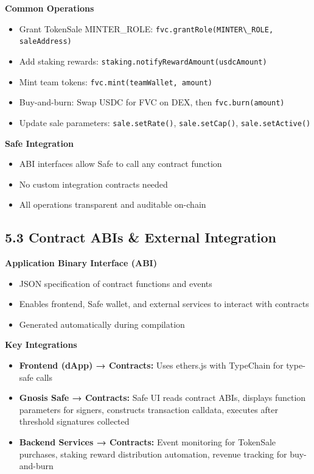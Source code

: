 \documentclass[
  paper=a4,
  ,captions=tableheading
]{scrartcl}
\newcommand{\passthrough}[1]{#1}
\providecommand{\tightlist}{%
  \setlength{\itemsep}{0pt}\setlength{\parskip}{0pt}}
\begin{document}
\textbf{Common Operations}

\begin{itemize}
\tightlist
\item
  Grant TokenSale MINTER\_ROLE: \passthrough{\lstinline!fvc.grantRole(MINTER\_ROLE, saleAddress)!}
\item
  Add staking rewards: \passthrough{\lstinline!staking.notifyRewardAmount(usdcAmount)!}
\item
  Mint team tokens: \passthrough{\lstinline!fvc.mint(teamWallet, amount)!}
\item
  Buy-and-burn: Swap USDC for FVC on DEX, then \passthrough{\lstinline!fvc.burn(amount)!}
\item
  Update sale parameters: \passthrough{\lstinline!sale.setRate()!}, \passthrough{\lstinline!sale.setCap()!}, \passthrough{\lstinline!sale.setActive()!}
\end{itemize}

\textbf{Safe Integration}

\begin{itemize}
\tightlist
\item
  ABI interfaces allow Safe to call any contract function
\item
  No custom integration contracts needed
\item
  All operations transparent and auditable on-chain
\end{itemize}

\subsection{5.3 Contract ABIs \& External Integration}\label{contract-abis-external-integration}

\textbf{Application Binary Interface (ABI)}

\begin{itemize}
\tightlist
\item
  JSON specification of contract functions and events
\item
  Enables frontend, Safe wallet, and external services to interact with contracts
\item
  Generated automatically during compilation
\end{itemize}

\textbf{Key Integrations}

\begin{itemize}
\tightlist
\item
  \textbf{Frontend (dApp) → Contracts:} Uses ethers.js with TypeChain for type-safe calls
\item
  \textbf{Gnosis Safe → Contracts:} Safe UI reads contract ABIs, displays function parameters for signers, constructs transaction calldata, executes after threshold signatures collected
\item
  \textbf{Backend Services → Contracts:} Event monitoring for TokenSale purchases, staking reward distribution automation, revenue tracking for buy-and-burn
\end{itemize}
\end{document}
